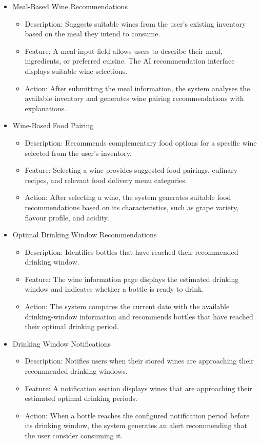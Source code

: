 \documentclass[conference]{IEEEtran}
\begin{document}
\begin{itemize}
    \item Meal-Based Wine Recommendations
    \begin{itemize}
        \item Description: Suggests suitable wines from the user's existing inventory based on the meal they intend to consume.
        \item Feature: A meal input field allows users to describe their meal, ingredients, or preferred cuisine. The AI recommendation interface displays suitable wine selections.
        \item Action: After submitting the meal information, the system analyses the available inventory and generates wine pairing recommendations with explanations.
    \end{itemize}

    \item Wine-Based Food Pairing
    \begin{itemize}
        \item Description: Recommends complementary food options for a specific wine selected from the user's inventory.
        \item Feature: Selecting a wine provides suggested food pairings, culinary recipes, and relevant food delivery menu categories.
        \item Action: After selecting a wine, the system generates suitable food recommendations based on its characteristics, such as grape variety, flavour profile, and acidity.
    \end{itemize}

    \item Optimal Drinking Window Recommendations
    \begin{itemize}
        \item Description: Identifies bottles that have reached their recommended drinking window.
        \item Feature: The wine information page displays the estimated drinking window and indicates whether a bottle is ready to drink.
        \item Action: The system compares the current date with the available drinking-window information and recommends bottles that have reached their optimal drinking period.
    \end{itemize}

    \item Drinking Window Notifications
    \begin{itemize}
        \item Description: Notifies users when their stored wines are approaching their recommended drinking windows.
        \item Feature: A notification section displays wines that are approaching their estimated optimal drinking periods.
        \item Action: When a bottle reaches the configured notification period before its drinking window, the system generates an alert recommending that the user consider consuming it.
    \end{itemize}


\end{itemize}
\end{document}
